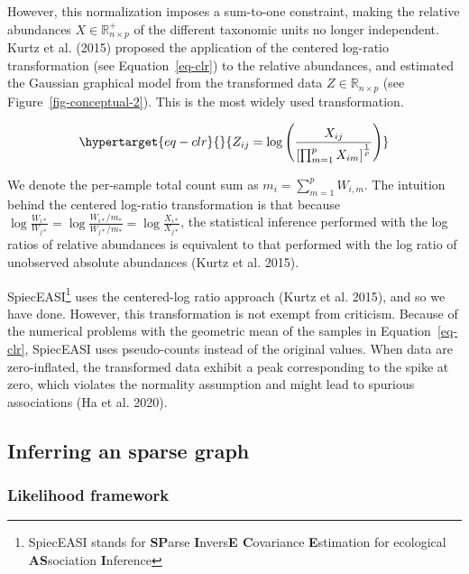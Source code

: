 \documentclass[
  a4paper,
]{article}
\begin{document}
However, this normalization imposes a sum-to-one constraint, making the
relative abundances \(X \in \mathbb R^+_{n\times p}\) of the different
taxonomic units no longer independent. Kurtz et al. (2015) proposed the
application of the centered log-ratio transformation (see
Equation~\ref{eq-clr}) to the relative abundances, and estimated the
Gaussian graphical model from the transformed data
\(Z \in \mathbb R_{n\times p}\) (see Figure~\ref{fig-conceptual-2}).
This is the most widely used transformation.

\begin{equation}\protect\hypertarget{eq-clr}{}{
Z_{ij} = \log \left (\frac{X_{ij}}{\left [ \prod_{m=1}^pX_{im}\right]^{\frac 1 p}}\right )
}\label{eq-clr}\end{equation}

We denote the per-sample total count sum as
\(m_i = \sum_{m=1}^p W_{i,m}\). The intuition behind the centered
log-ratio transformation is that because
\(\log{\frac {W_{i*}}{W_{j*}}} = \log{\frac {W_{i*}/m_*}{W_{j*}/m_*}} = \log{\frac {X_{i*}}{X_{j*}}}\),
the statistical inference performed with the log ratios of relative
abundances is equivalent to that performed with the log ratio of
unobserved absolute abundances (Kurtz et al. 2015).

SpiecEASI\footnote{SpiecEASI stands for \textbf{SP}arse
  \textbf{I}nvers\textbf{E C}ovariance \textbf{E}stimation for
  ecological \textbf{AS}sociation \textbf{I}nference} uses the
centered-log ratio approach (Kurtz et al. 2015), and so we have done.
However, this transformation is not exempt from criticism. Because of
the numerical problems with the geometric mean of the samples in
Equation~\ref{eq-clr}, SpiecEASI uses pseudo-counts instead of the
original values. When data are zero-inflated, the transformed data
exhibit a peak corresponding to the spike at zero, which violates the
normality assumption and might lead to spurious associations (Ha et al.
2020).

\hypertarget{inferring-an-sparse-graph}{%
\subsection{Inferring an sparse graph}\label{inferring-an-sparse-graph}}

\hypertarget{likelihood-framework}{%
\subsubsection{Likelihood framework}\label{likelihood-framework}}
\end{document}
